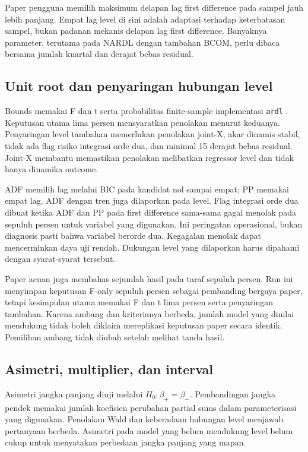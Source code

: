 Paper pengguna memilih maksimum delapan lag first difference pada sampel jauh lebih panjang. Empat lag level di sini adalah adaptasi terhadap keterbatasan sampel, bukan padanan mekanis delapan lag first difference. Banyaknya parameter, terutama pada NARDL dengan tambahan BCOM, perlu dibaca bersama jumlah kuartal dan derajat bebas residual.

\subsection{Unit root dan penyaringan hubungan level}
Bounds memakai F dan t serta probabilitas finite-sample implementasi \texttt{ardl} \cite{pss,ks}. Keputusan utama lima persen mensyaratkan penolakan menurut keduanya. Penyaringan level tambahan memerlukan penolakan joint-X, akar dinamis stabil, tidak ada flag risiko integrasi orde dua, dan minimal 15 derajat bebas residual. Joint-X membantu memastikan penolakan melibatkan regressor level dan tidak hanya dinamika outcome.

ADF memilih lag melalui BIC pada kandidat nol sampai empat; PP memakai empat lag. ADF dengan tren juga dilaporkan pada level. Flag integrasi orde dua dibuat ketika ADF dan PP pada first difference sama-sama gagal menolak pada sepuluh persen untuk variabel yang digunakan. Ini peringatan operasional, bukan diagnosis pasti bahwa variabel berorde dua. Kegagalan menolak dapat mencerminkan daya uji rendah. Dukungan level yang dilaporkan harus dipahami dengan syarat-syarat tersebut.

Paper acuan juga membahas sejumlah hasil pada taraf sepuluh persen. Run ini menyimpan keputusan F-only sepuluh persen sebagai pembanding bergaya paper, tetapi kesimpulan utama memakai F dan t lima persen serta penyaringan tambahan. Karena ambang dan kriterianya berbeda, jumlah model yang dinilai mendukung tidak boleh diklaim mereplikasi keputusan paper secara identik. Pemilihan ambang tidak diubah setelah melihat tanda hasil.

\subsection{Asimetri, multiplier, dan interval}
Asimetri jangka panjang diuji melalui $H_0:\beta_+=\beta_-$. Pembandingan jangka pendek memakai jumlah koefisien perubahan partial sums dalam parameterisasi yang digunakan. Penolakan Wald dan keberadaan hubungan level menjawab pertanyaan berbeda. Asimetri pada model yang belum mendukung level belum cukup untuk menyatakan perbedaan jangka panjang yang mapan.

